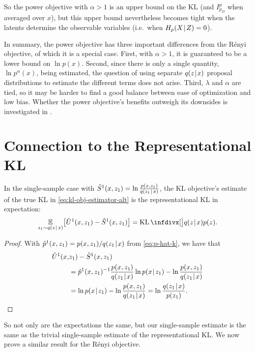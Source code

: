 So the power objective with $\alpha>1$ is an upper bound on the KL (and $I_{p_D}^p$ when averaged over $x$), but this upper bound nevertheless becomes tight when the latents determine the observable variables (i.e.\ when $H_p(X\hspace{0.08em}|\hspace{0.11em} Z)=0$).

In summary, the power objective has three important differences from the Rényi objective, of which it is a special case.
First, with $\alpha>1$, it is guaranteed to be a lower bound on $\ln p(x)$.
Second, since there is only a single quantity, $\ln p^\alpha(x)$, being estimated, the question of using separate $q(z\hspace{0.08em}|\hspace{0.11em} x)$ proposal distributions to estimate the different terms does not arise.
Third, $\lambda$ and $\alpha$ are tied, so it may be harder to find a good balance between ease of optimization and low bias.
Whether the power objective's benefits outweigh its downsides is investigated in .

\section{Connection to the Representational KL}
\label{sec:connection-to-the-representational-kl}

\begin{proposition}
\label{prop:single-sample-kl-estimate}
In the single-sample case with $\hat{S}^1(x, z_1) = \ln \frac{p(x,z_1)}{q(z_1\hspace{0.08em}|\hspace{0.11em} x)}$, the KL objective's estimate of the true KL in \eqref{eq:kl-obj-estimator-alt} is the representational KL in expectation:
\begin{align*}
\E_{z_1 \sim q(z\tmid x)} \bigl[ \hat{U}^1(x,z_1) - \hat{S}^1(x,z_1) \bigr] = \KL\Div[\big]{q(z\tmid x)}{p(z)}.
\end{align*}
\end{proposition}
\begin{proof}
With $\hat{p}^1(x, z_1) = p(x,z_1)/q(z_1\hspace{0.08em}|\hspace{0.11em} x)$ from \eqref{eq:p-hat-k}, we have that
\begin{align*}
\hat{U}^1(x,&z_1) - \hat{S}^1(x,z_1)\\
&= \hat{p}^1(x, z_1)^{-1} \frac{p(x,z_1)}{q(z_1\hspace{0.08em}|\hspace{0.11em} x)} \ln p(x\hspace{0.08em}|\hspace{0.11em} z_1) -
   \ln \frac{p(x,z_1)}{q(z_1\hspace{0.08em}|\hspace{0.11em} x)} \\
&= \ln p(x\hspace{0.08em}|\hspace{0.11em} z_1) - \ln \frac{p(x,z_1)}{q(z_1\hspace{0.08em}|\hspace{0.11em} x)}
= \ln \frac{q(z_1\hspace{0.08em}|\hspace{0.11em} x)}{p(z_1)}.
\qedhere
\end{align*}
\end{proof}

So not only are the expectations the same, but our single-sample estimate is the same as the trivial single-sample estimate of the representational KL.
We now prove a similar result for the Rényi objective.


